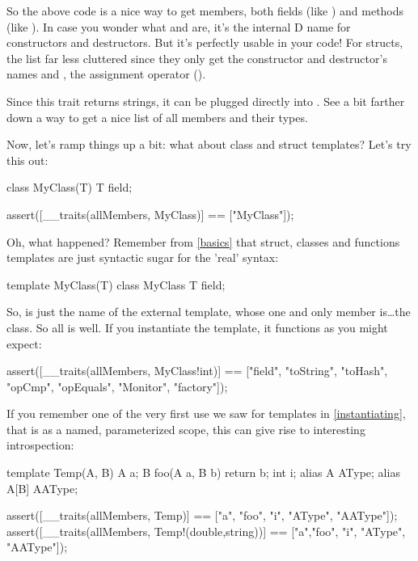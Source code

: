 So the above code is a nice way to get members, both fields (like ) and methods (like ). In case you wonder what  and  are, it's the internal D name for constructors and destructors. But it's perfectly usable in your code! For structs, the list far less cluttered since they only get the constructor and destructor's names and , the assignment operator (\DD{=}).

Since this trait returns strings, it can be plugged directly into . See a bit farther down a way to get a nice list of all members and their types.

Now, let's ramp things up a bit: what about class and struct templates? Let's try this out:

\begin{dcode}
class MyClass(T)
{
    T field;
}

assert([__traits(allMembers, MyClass)] == ["MyClass"]);
\end{dcode}

Oh, what happened? Remember from \autoref{basics} that struct, classes and functions templates are just syntactic sugar for the 'real' syntax:

\begin{dcode}
template MyClass(T)
{
    class MyClass
    {
        T field;
    }
}
\end{dcode}

So,  is just the name of the external template, whose one and only member is\ldots the  class. So all is well. If you instantiate the template, it functions as you might expect:

\begin{dcode}
assert([__traits(allMembers, MyClass!int)] 
    == ["field", "toString", "toHash", "opCmp", 
        "opEquals", "Monitor", "factory"]);
\end{dcode}

If you remember one of the very first use we saw for templates in \ref{instantiating}, that is as a named, parameterized scope, this can give rise to interesting introspection:

\begin{dcode}
template Temp(A, B)
{
    A a;
    B foo(A a, B b) { return b;}
    int i;
    alias A    AType;
    alias A[B] AAType;
}

assert([__traits(allMembers, Temp)] 
    == ["a", "foo", "i", "AType", "AAType"]);
assert([__traits(allMembers, Temp!(double,string))] 
    == ["a","foo", "i", "AType", "AAType"]);
\end{dcode} 

